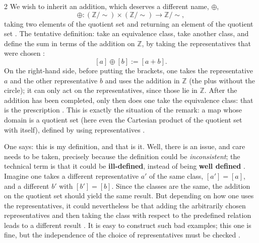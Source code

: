 \begin{paracol}{2}
We wish to inherit an addition, which deserves a different name, $\oplus$,
\[
  \oplus\colon (\mathbb Z/{\sim})\times(\mathbb Z/{\sim})\to\mathbb Z/{\sim},
\]
taking two elements of the quotient set and returning an element of the quotient set . The
tentative definition: take an equivalence class, take another class, and define the sum in terms of the addition on
$\mathbb Z$, by taking the representatives that were chosen :
\[
  [a]\oplus[b]:=[a+b].
\]
On the right-hand side, before putting the brackets, one takes the representative $a$ and the other representative $b$ and
uses the addition in $\mathbb Z$ (the plus without the circle); it can only act on the representatives, since those lie in
$\mathbb Z$. After the addition has been completed, only then does one take the equivalence class: that is the
prescription . This is exactly the situation of the remark: a map whose
domain is a quotient set (here even the Cartesian product of the quotient set with itself), defined by using
representatives .

One says: this is my definition, and that is it. Well, there is an issue, and care needs to be taken, precisely because
the definition could be \emph{inconsistent}; the technical term is that it could be \textbf{ill-defined}, instead of being
\textbf{well defined} . Imagine one takes a different representative $a'$ of
the same class, $[a']=[a]$, and a different $b'$ with $[b']=[b]$. Since the classes are the same, the addition on the
quotient set should yield the same result. But depending on how one uses the representatives, it could nevertheless be that
adding the arbitrarily chosen representatives and then taking the class with respect to the predefined relation leads to a
different result . It is easy to construct such bad examples; this
one is fine, but the independence of the choice of representatives must be checked .


\end{paracol}
